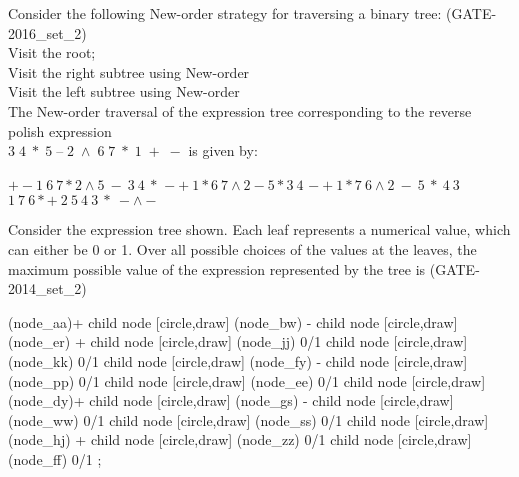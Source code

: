 \begin{questyle}
  \question  Consider the following New-order strategy for traversing a binary tree:  (GATE-2016\_set\_2)\\
            Visit the root; \\
            Visit the right subtree using New-order \\
            Visit the left subtree using New-order \\
            The New-order traversal of the expression tree corresponding to the reverse polish
            expression \\  \(  3 \; 4 \;  * \;  5 \;  – \;  2 \;  \wedge \;  6 \;  7 \;  * \;  1 \;  + \;  - \) is given by:

  \begin{choices}
    \choice         \(  + -  1 \ 6 \ 7 * 2 \wedge 5 \ - \ 3 \ 4 \ * \)
    \choice         \( - +  1 *  6 \ 7 \wedge 2 - 5 * 3 \ 4  \)
    \CorrectChoice  \( - +  1 * 7 \ 6  \wedge 2 \ - \ 5 \ * \ 4 \ 3  \)
    \choice         \( 1 \ 7 \ 6 *  + \ 2 \ 5  \ 4 \ 3 \ * \ - \wedge -  \)
  \end{choices}
\end{questyle}

\begin{questyle}
  \question  Consider the expression tree shown. Each leaf represents a numerical value, which can
             either be 0 or 1. Over all possible choices of the values at the leaves, the maximum
             possible value of the expression represented by the tree is  \fillin[6] (GATE-2014\_set\_2)

  \begin{myTreeLThree}
     (node_aa){+}
    child
    {
        node [circle,draw] (node_bw) {-}
        child
        {
            node [circle,draw] (node_er) {+}
            child{ node [circle,draw] (node_jj) {0/1} }
            child{ node [circle,draw] (node_kk) {0/1} }
        }
        child
        {
            node [circle,draw] (node_fy) {-}
            child{ node [circle,draw] (node_pp) {0/1} }
            child{ node [circle,draw] (node_ee) {0/1} }
        }
    }
    child
    {
        node [circle,draw] (node_dy){+}
        child
        {
            node [circle,draw] (node_gs) {-}
            child{ node [circle,draw] (node_ww) {0/1} }
            child{ node [circle,draw] (node_ss) {0/1} }
        }
        child
        {
            node [circle,draw] (node_hj) {+}
            child{ node [circle,draw] (node_zz) {0/1} }
            child{ node [circle,draw] (node_ff) {0/1} }
        }
    };
  \end{myTreeLThree}


\end{questyle}


